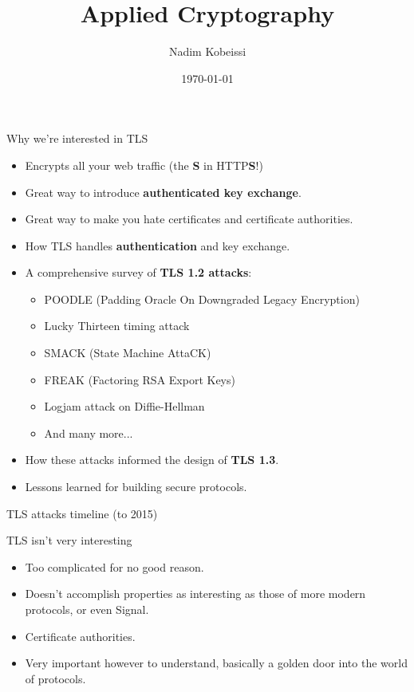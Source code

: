 \documentclass[aspectratio=169, lualatex, handout]{beamer}
\title{Applied Cryptography}
\author{Nadim Kobeissi}
\institute{American University of Beirut}
\date{\today}
\begin{document}
\begin{frame}[plain]
	\titlepage
\end{frame}

\begin{frame}{Why we're interested in TLS}
	\begin{itemize}[<+->]
		\item Encrypts all your web traffic (the \textbf{S} in HTTP\textbf{S}!)
		\item Great way to introduce \textbf{authenticated key exchange}.
		\item Great way to make you hate certificates and certificate authorities.
		\item How TLS handles \textbf{authentication} and key exchange.
		\item A comprehensive survey of \textbf{TLS 1.2 attacks}:
		      \begin{itemize}
			      \item POODLE (Padding Oracle On Downgraded Legacy Encryption)
			      \item Lucky Thirteen timing attack
			      \item SMACK (State Machine AttaCK)
			      \item FREAK (Factoring RSA Export Keys)
			      \item Logjam attack on Diffie-Hellman
			      \item And many more...
		      \end{itemize}
		\item How these attacks informed the design of \textbf{TLS 1.3}.
		\item Lessons learned for building secure protocols.
	\end{itemize}
\end{frame}

\begin{frame}{TLS attacks timeline (to 2015)}
\end{frame}

\begin{frame}{TLS isn't very interesting}
	\begin{itemize}
		\item Too complicated for no good reason.
		\item Doesn't accomplish properties as interesting as those of more modern protocols, or even Signal.
		\item Certificate authorities.
		\item Very important however to understand, basically a golden door into the world of protocols.
	\end{itemize}
\end{frame}
\end{document}
